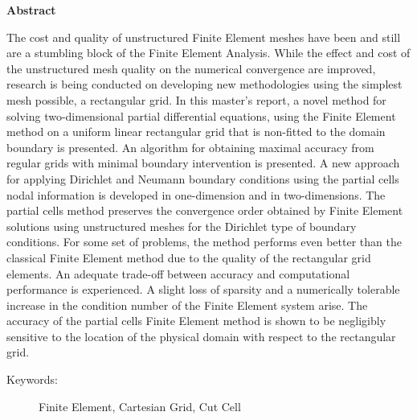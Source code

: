 \documentclass[12pt,twoside]{article}
\def\ssp{\def\baselinestretch{1.0}\large\normalsize}
\begin{document}

\flushbottom
\pagestyle{empty}
%
\ssp

\begin{center}
{\textbf{Abstract}}
\end{center}
The cost and quality of unstructured Finite Element meshes have been and still are a stumbling block of the Finite Element Analysis. While the effect and cost of the unstructured mesh quality on the numerical convergence are improved, research is being conducted on developing new methodologies using the simplest mesh possible, a rectangular grid. In this master's report, a novel method for solving two-dimensional partial differential equations, using the Finite Element method on a uniform linear rectangular grid that is non-fitted to the domain boundary is presented. An algorithm for obtaining maximal accuracy from regular grids with minimal boundary intervention is presented. A new approach for applying Dirichlet and Neumann boundary conditions using the partial cells nodal information is developed in one-dimension and in two-dimensions. The partial cells method preserves the convergence order obtained by Finite Element solutions using unstructured meshes for the Dirichlet type of boundary conditions.  For some set of problems, the method performs even better than the classical Finite Element method due to the quality of the rectangular grid elements.  An adequate trade-off between accuracy and computational performance is experienced.  A slight loss of sparsity and a numerically tolerable increase in the condition number of the Finite Element system arise. The accuracy of the partial cells Finite Element method is shown to be negligibly sensitive to the location of the physical domain with respect to the rectangular grid. 
\begin{description}
\item[Keywords:] Finite Element, Cartesian Grid, Cut Cell
\end{description}
\end{document}

